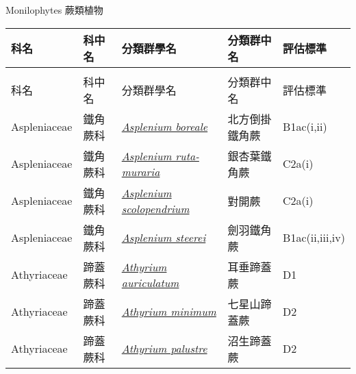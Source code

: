 \noindent\normalfont\selectfont Monilophytes 蕨類植物
\footnotesize\selectfont
        {\def\arraystretch{1.5}\tabcolsep=2pt
        \begin{longtable}{p{2.5cm}p{2.5cm}p{4.5cm}p{2.5cm}p{3cm}}
        \toprule
          科名 & 科中名 & 分類群學名 & 分類群中名 & 評估標準 \\
        \midrule 
        \endfirsthead

        \multicolumn{4}{l}{\bfseries\Large\color{red}{國家易危 (NVU) 類別維管束植物名錄(續)}} \\
        \toprule
        科名 & 科中名 & 分類群學名 & 分類群中名 & 評估標準 \\
        \midrule
        \endhead
                Aspleniaceae & 鐵角蕨科 & \href{http://www.theplantlist.org/tpl1.1/search?q=Asplenium+boreale}{\textit{Asplenium boreale} } & 北方倒掛鐵角蕨 & B1ac(i,ii) \index{Asplenium@\textit{Asplenium}!boreale@\textit{boreale}}  \index{北方倒掛鐵角蕨} \\
    Aspleniaceae & 鐵角蕨科 & \href{http://www.theplantlist.org/tpl1.1/search?q=Asplenium+ruta-muraria}{\textit{Asplenium ruta-muraria} } & 銀杏葉鐵角蕨 & C2a(i) \index{Asplenium@\textit{Asplenium}!ruta-muraria@\textit{ruta-muraria}}  \index{銀杏葉鐵角蕨} \\
    Aspleniaceae & 鐵角蕨科 & \href{http://www.theplantlist.org/tpl1.1/search?q=Asplenium+scolopendrium}{\textit{Asplenium scolopendrium} } & 對開蕨 & C2a(i) \index{Asplenium@\textit{Asplenium}!scolopendrium@\textit{scolopendrium}}  \index{對開蕨} \\
    Aspleniaceae & 鐵角蕨科 & \href{http://www.theplantlist.org/tpl1.1/search?q=Asplenium+steerei}{\textit{Asplenium steerei} } & 劍羽鐵角蕨 & B1ac(ii,iii,iv) \index{Asplenium@\textit{Asplenium}!steerei@\textit{steerei}}  \index{劍羽鐵角蕨} \\
    Athyriaceae & 蹄蓋蕨科 & \href{http://www.theplantlist.org/tpl1.1/search?q=Athyrium+auriculatum}{\textit{Athyrium auriculatum} } & 耳垂蹄蓋蕨 & D1 \index{Athyrium@\textit{Athyrium}!auriculatum@\textit{auriculatum}}  \index{耳垂蹄蓋蕨} \\
    Athyriaceae & 蹄蓋蕨科 & \href{http://www.theplantlist.org/tpl1.1/search?q=Athyrium+minimum}{\textit{Athyrium minimum} } & 七星山蹄蓋蕨 & D2 \index{Athyrium@\textit{Athyrium}!minimum@\textit{minimum}}  \index{七星山蹄蓋蕨} \\
    Athyriaceae & 蹄蓋蕨科 & \href{http://www.theplantlist.org/tpl1.1/search?q=Athyrium+palustre}{\textit{Athyrium palustre} } & 沼生蹄蓋蕨 & D2 \index{Athyrium@\textit{Athyrium}!palustre@\textit{palustre}}  \index{沼生蹄蓋蕨} \\

\end{longtable}}
